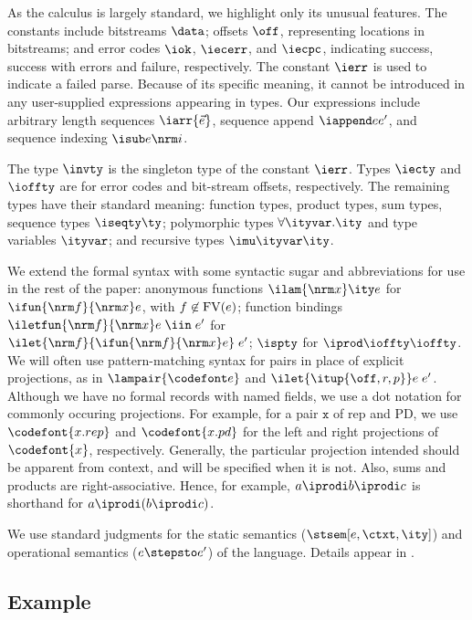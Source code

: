 As the calculus is largely standard, we highlight only its
unusual features. The constants include bitstreams $\data$; offsets $\off$,
representing locations in bitstreams; and error codes $\iok$,
$\iecerr$, and $\iecpc$, indicating success, success with errors and
failure, respectively. The constant $\ierr$ is used to indicate a
failed parse.  Because of its specific meaning, it cannot be introduced in
any user-supplied expressions appearing in \ddc{} types. 
Our expressions include arbitrary length
sequences $\iarr{\vec e}$, sequence append $\iappend e
{e'}$, and sequence indexing $\isub e {\nrm i}$.

The type $\invty$ is the singleton type of the constant $\ierr$.
Types $\iecty$ and $\ioffty$ are for error codes and bit-stream
offsets, respectively. The remaining types have their standard
meaning: function types, product types, sum types, sequence types
$\iseqty \ty$; polymorphic types $\forall \ityvar.\ity$ and type
variables $\ityvar$; and recursive types $\imu \ityvar \ity$.

We extend the formal syntax with some syntactic sugar and
abbreviations for use in the rest of the paper: anonymous functions
$\ilam {\nrm x} \ity e$ for $\ifun {\nrm f} {\nrm x} e$, with $f
\not\in {\rm FV}(e)$; function bindings $\iletfun {\nrm f} {\nrm x} e
\; \iin \; e'$ for $\ilet {\nrm f} {\ifun {\nrm f} {\nrm x} e} \; e'$;
$\ispty$ for $\iprod \ioffty \ioffty$.  We will often use
pattern-matching syntax for pairs in place of explicit projections, as
in $\lampair{\codefont e}$ and $\ilet {\itup{\off,r,p}} e\; e'$.  Although
we have no formal records with named fields, we use a dot notation for
commonly occuring projections. For example, for a pair $\mathtt x$ of
rep and PD, we use $\codefont{x.rep}$ and $\codefont{x.pd}$ for the
left and right projections of $\codefont{x}$, respectively. Generally,
the particular projection intended should be apparent from context,
and will be specified when it is not. Also, sums and products are
right-associative. Hence, for example, $a \iprodi b \iprodi c$ is
shorthand for $a \iprodi (b \iprodi c)$.

We use standard judgments for the static semantics
($\stsem[e,{\ctxt},\ity]$) and operational semantics ($e
\stepsto e'$) of the \implang{} language. Details appear in .

\subsection{Example}
\label{sec:ddc-example}

